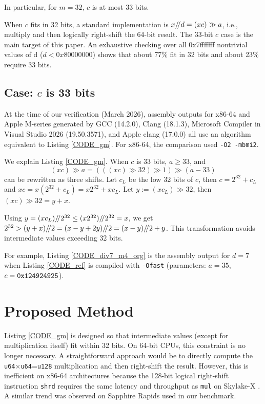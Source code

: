 \documentclass{article}
\begin{document}
In particular, for $m=32$, $c$ is at most 33 bits.

When $c$ fits in 32 bits, a standard implementation is
$x {\mathbin{/\mkern-4mu/}} d=(xc)\gg a$,
i.e., multiply and then logically right-shift the 64-bit result.
The 33-bit $c$ case is the main target of this paper.
An exhaustive checking over all 0x7fffffff nontrivial values of d ($d<0x80000000$) shows that about 77\% fit in 32 bits and about 23\% require 33 bits.


\subsection{Case: $c$ is 33 bits}
At the time of our verification (March 2026), assembly outputs for x86-64 and Apple M-series generated by GCC (14.2.0), Clang (18.1.3), Microsoft Compiler in Visual Studio 2026 (19.50.3571), and Apple clang (17.0.0) all use an algorithm equivalent to Listing \ref{CODE_gm}.
For x86-64, the comparison used \texttt{-O2 -mbmi2}.



We explain Listing \ref{CODE_gm}.
When $c$ is 33 bits, $a \geq 33$, and
$$(xc)\gg a=(((xc)\gg 32)\gg 1)\gg (a-33)$$
can be rewritten as three shifts.
Let $c_L$ be the low 32 bits of $c$, then $c=2^{32}+c_L$ and
$xc=x(2^{32}+c_L)=x2^{32}+xc_L$.
Let $y := (xc_L)\gg 32$, then $(xc)\gg 32 = y+x$.

Using $y=(xc_L) {\mathbin{/\mkern-4mu/}} 2^{32}\leq(x2^{32}) {\mathbin{/\mkern-4mu/}} 2^{32}=x$, we get
$2^{32}>(y+x) {\mathbin{/\mkern-4mu/}} 2=(x-y+2y) {\mathbin{/\mkern-4mu/}} 2=(x-y) {\mathbin{/\mkern-4mu/}} 2+y$.
This transformation avoids intermediate values exceeding 32 bits.

For example, Listing \ref{CODE_div7_m4_org} is the assembly output for $d=7$ when Listing \ref{CODE_ref} is compiled with {\tt -Ofast} (parameters: $a=35$, $c={\tt 0x124924925}$).



\section{Proposed Method}
Listing \ref{CODE_gm} is designed so that intermediate values (except for multiplication itself) fit within 32 bits.
On 64-bit CPUs, this constraint is no longer necessary.
A straightforward approach would be to directly compute the {\tt u64}×{\tt u64}={\tt u128} multiplication and then right-shift the result.
However, this is inefficient on x86-64 architectures because the 128-bit logical right-shift instruction {\tt shrd} requires the same latency and throughput as {\tt mul} on Skylake-X \cite{anger}.
A similar trend was observed on Sapphire Rapids used in our benchmark.
\end{document}
